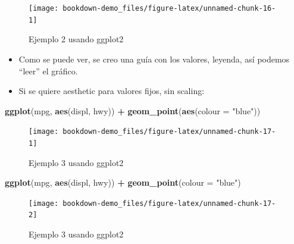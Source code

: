 \documentclass[12pt,]{book}
\newenvironment{Shaded}{\begin{snugshade}}{\end{snugshade}}
\newcommand{\KeywordTok}[1]{\textcolor[rgb]{0.13,0.29,0.53}{\textbf{#1}}}
\newcommand{\DataTypeTok}[1]{\textcolor[rgb]{0.13,0.29,0.53}{#1}}
\newcommand{\StringTok}[1]{\textcolor[rgb]{0.31,0.60,0.02}{#1}}
\newcommand{\OperatorTok}[1]{\textcolor[rgb]{0.81,0.36,0.00}{\textbf{#1}}}
\newcommand{\NormalTok}[1]{#1}
\providecommand{\tightlist}{%
  \setlength{\itemsep}{0pt}\setlength{\parskip}{0pt}}
\begin{document}
\begin{figure}

{\centering \texttt{[image: bookdown-demo\_files/figure-latex/unnamed-chunk-16-1]} 

}

\caption{Ejemplo 2 usando ggplot2}\label{fig:unnamed-chunk-16}
\end{figure}

\begin{itemize}
\tightlist
\item
  Como se puede ver, se creo una guía con los valores, leyenda, así
  podemos ``leer'' el gráfico.
\item
  Si se quiere aesthetic para valores fijos, sin scaling:
\end{itemize}

\begin{Shaded}
\begin{Highlighting}[]
\KeywordTok{ggplot}\NormalTok{(mpg, }\KeywordTok{aes}\NormalTok{(displ, hwy)) }\OperatorTok{+}\StringTok{ }\KeywordTok{geom_point}\NormalTok{(}\KeywordTok{aes}\NormalTok{(}\DataTypeTok{colour =} \StringTok{"blue"}\NormalTok{))}
\end{Highlighting}
\end{Shaded}

\begin{figure}

{\centering \texttt{[image: bookdown-demo\_files/figure-latex/unnamed-chunk-17-1]} 

}

\caption{Ejemplo 3 usando ggplot2}\label{fig:unnamed-chunk-171}
\end{figure}

\begin{Shaded}
\begin{Highlighting}[]
\KeywordTok{ggplot}\NormalTok{(mpg, }\KeywordTok{aes}\NormalTok{(displ, hwy)) }\OperatorTok{+}\StringTok{ }\KeywordTok{geom_point}\NormalTok{(}\DataTypeTok{colour =} \StringTok{"blue"}\NormalTok{)}
\end{Highlighting}
\end{Shaded}

\begin{figure}

{\centering \texttt{[image: bookdown-demo\_files/figure-latex/unnamed-chunk-17-2]} 

}

\caption{Ejemplo 3 usando ggplot2}\label{fig:unnamed-chunk-172}
\end{figure}
\end{document}
